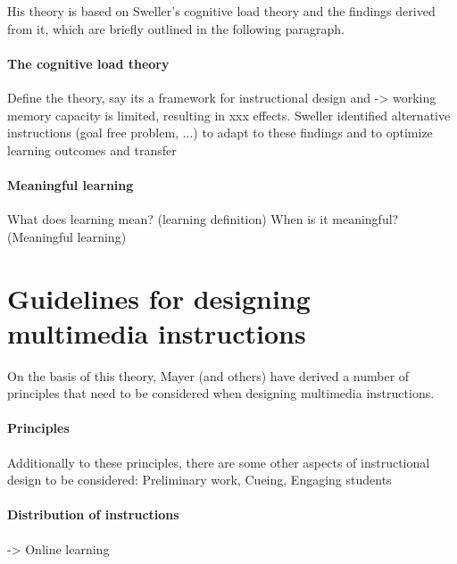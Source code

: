 His theory is based on Sweller's cognitive load theory and the findings derived from it, which are briefly outlined in the following paragraph.

\paragraph{The cognitive load theory} Define the theory, say its a framework for instructional design and -> working memory capacity is limited, resulting in xxx effects. Sweller identified alternative instructions (goal free problem, ...) to adapt to these findings and to optimize learning outcomes and transfer


\paragraph{Meaningful learning} What does learning mean? (learning definition) When is it meaningful? (Meaningful learning)



\section{Guidelines for designing multimedia instructions}
On the basis of this theory, Mayer (and others) have derived a number of principles that need to be considered when designing multimedia instructions. 

\paragraph{Principles}


Additionally to these principles, there are some other aspects of instructional design to be considered: Preliminary work, Cueing, Engaging students 

\paragraph{Distribution of instructions} -> Online learning 


